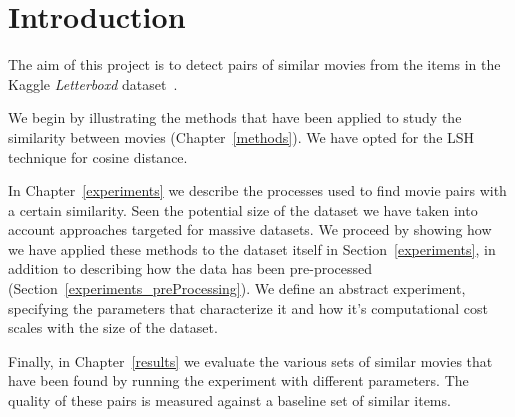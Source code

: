 \chapter*{Introduction}\label{introduction}
The aim of this project is to detect pairs of similar movies from the items in the Kaggle \textit{Letterboxd} dataset~\cite{Letterboxd2024}.

We begin by illustrating the methods that have been applied to study the similarity between movies (Chapter~\ref{methods}). We have opted for the LSH technique for cosine distance.

In Chapter~\ref{experiments} we describe the processes used to find movie pairs with a certain similarity. Seen the potential size of the dataset we have taken into account approaches targeted for massive datasets. We proceed by showing how we have applied these methods to the dataset itself in Section~\ref{experiments}, in addition to describing how the data has been pre-processed (Section~\ref{experiments_preProcessing}). We define an abstract experiment, specifying the parameters that characterize it and how it's computational cost scales with the size of the dataset.

Finally, in Chapter~\ref{results} we evaluate the various sets of similar movies that have been found by running the experiment with different parameters. The quality of these pairs is measured against a baseline set of similar items.
